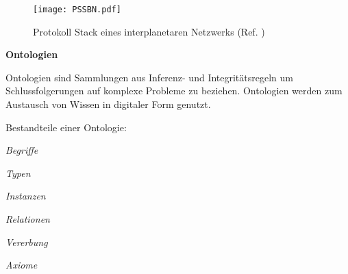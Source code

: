 \begin{figure}[H]
\centering
\texttt{[image: PSSBN.pdf]}
\caption{Protokoll Stack eines interplanetaren Netzwerks (Ref.
\cite{DTNBundle})}
\label{fig:PSSBN}
\end{figure}

\textbf{Ontologien}

Ontologien sind Sammlungen aus Inferenz- und Integrit{\"a}tsregeln um
Schlussfolgerungen auf komplexe Probleme zu beziehen. Ontologien werden zum
Austausch von Wissen in digitaler Form genutzt.

Bestandteile einer Ontologie:

 \begin{compactenum}[I]
     \item \textit{Begriffe}
     \item \textit{Typen}
     \item \textit{Instanzen}
     \item \textit{Relationen}
     \item \textit{Vererbung}
     \item \textit{Axiome}
   \end{compactenum}

